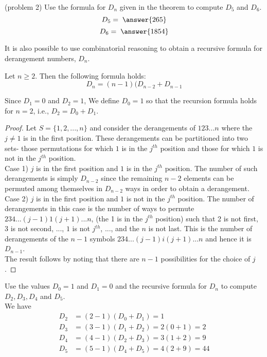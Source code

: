 \documentclass[handout]{ximera}
\begin{document}
\begin{problem}(problem 2)
Use the formula for $D_n$ given in the theorem to compute $D_5$ and $D_6$.\\
\[
D_5 = \; \answer{265}
\]
\[
D_6 = \; \answer{1854}
\]
\end{problem}

 




It is also possible to use combinatorial reasoning to obtain a recursive formula for 
derangement numbers, $D_n$.

\begin{proposition}
Let $n \geq 2$. Then the following formula holds:
\[
D_n = (n-1)(D_{n-2} + D_{n-1}
\]
\end{proposition}

\begin{remark}
Since $D_1 = 0$ and $D_2 = 1$, We define $D_0 = 1$ so that the recursion formula 
holds for $n=2$, i.e., $D_2 = D_0 + D_1$.
\end{remark}

\begin{proof}
Let $S = \{1, 2, ..., n\}$ and consider the 
derangements of $123...n$ where the $j \neq 1$ is in the first position. 
These derangements can be partitioned into two sets- those permutations for which $1$ is in 
the $j^{th}$ position and those for which $1$ is not in the $j^{th}$ position.\\
Case 1) $j$ is in the first position and $1$ is in the $j^{th}$ position. 
The number of such derangements is simply $D_{n-2}$ since the remaining $n-2$ elements can be permuted among themselves 
in $D_{n-2}$ ways in order to obtain a derangement.\\
Case 2) $j$ is in the first position and $1$ is not in the $j^{th}$ position. 
The number of derangements in this case is the number of ways to permute $234...(j-1)1(j+1)...n$,
(the 1 is in the $j^{th}$ position) such that 2 is not first, 
3 is not second, ..., $1$ is not $j^{th}$, ..., and the $n$ is not last. 
This is the number of derangements of the $n-1$ symbols $234...(j-1)i(j+1)...n$ and hence it is $D_{n-1}$.\\
The result follows by noting that there are $n-1$ possibilities for the choice of $j$.
\end{proof}

\begin{example}[example 3]
Use the values $D_0 = 1$ and $D_1 = 0$ and the recursive formula for $D_n$ to compute $D_2, D_3, D_4$ and $D_5$.\\
We have
\begin{align*}
D_2 &= (2-1)(D_0 + D_1) = 1\\
D_3 &= (3-1)(D_1 + D_2) = 2(0+1) = 2\\
D_4 &= (4-1)(D_2 + D_3) = 3(1+2) = 9\\
D_5 &= (5-1)(D_4 + D_5) = 4(2+9) = 44\\
\end{align*}
\end{example}
\end{document}
